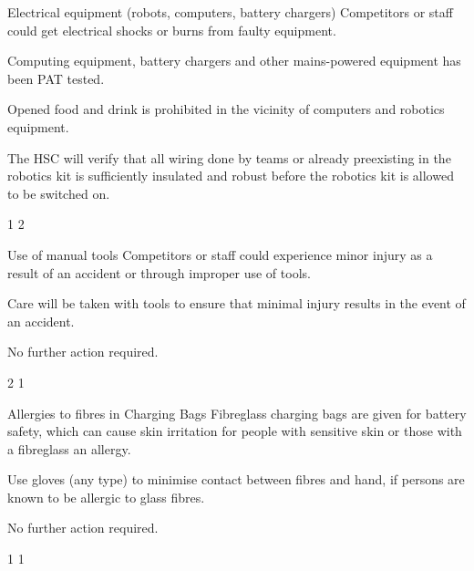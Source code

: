 {    \risk
        {Electrical equipment (robots, computers, battery chargers)}
        {Competitors or staff could get electrical shocks or burns from faulty
         equipment.}
        {\item Computing equipment, battery chargers and other mains-powered
         equipment has been PAT tested.
         \item Opened food and drink is prohibited in the vicinity of
         computers and robotics equipment.}
        {\item The HSC will verify that all wiring done by teams or already
         preexisting in the robotics kit is sufficiently insulated and robust
         before the robotics kit is allowed to be switched on.}
        {1} %
        {2} %

    \risk
        {Use of manual tools}
        {Competitors or staff could experience minor injury as a result of an
         accident or through improper use of tools.}
        {\item Care will be taken with tools to ensure that minimal injury
         results in the event of an accident.}
        {\item No further action required.}
        {2} %
        {1} %

    \risk
        {Allergies to fibres in Charging Bags}
        {Fibreglass charging bags are given for battery safety, which can
        cause skin irritation for people with sensitive skin or those with a
        fibreglass an allergy.}
        {\item Use gloves (any type) to minimise contact between fibres and hand, if persons
are known to be allergic to glass fibres.}
        {\item No further action required.}
        {1} %
        {1} %

}


\newcommand{\postrisks}{
    \subsection*{Risk of fire}

    To minimise the risk of fire resulting from this activity, food and drink
    will not be allowed near electrical equipment, and naked flames will be
    prohibited. The risk of fire occurring elsewhere in the building(s) is
    controlled primarily by the building operator\estatesfacilitiesfootnote.
    The HSC will ensure that all people present are informed of the
    locations of the exits and whether any fire drills are expected to take
    place. Should a fire break out (or any other event requiring evacuation),
    all people are to evacuate through the nearest accessible exit.
}



